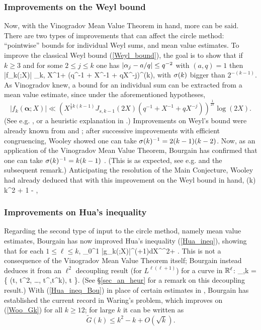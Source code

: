 \documentclass[brochure,english,12pt]{bourbaki}%
\newcommand{\albf}{\boldsymbol\alpha}
\begin{document}
\subsubsection{Improvements on the Weyl bound}
Now, with the Vinogradov Mean Value Theorem in hand, more can be said. There are two types of improvements that can affect the circle method: ``pointwise''  bounds for  individual Weyl sums, and  mean value estimates. 
To improve the classical Weyl bound (\ref{Weyl_bound}), the goal is to show that if $k \geq 3$ and for some $2 \leq j \leq k$ one has $|\alpha_j - a/q| \leq q^{-2}$ with $(a,q)=1$ then 
\beq\label{Weyl_bound'}
 |f_k(\albf;X)| \ll_{k,\ep} X^{1+\ep} (q^{-1} + X^{-1}  + qX^{-j})^{\sig(k)},
\eeq
with $\sigma(k)$ bigger than $2^{-(k-1)}$.
As Vinogradov knew, a bound for an individual sum can be extracted from a mean value estimate, since  under the aforementioned hypotheses,
\[
|f_k(\albf;X)| \ll ( X^{\frac{1}{2}k(k-1)} J_{s,k-1}(2X) (q^{-1} + X^{-1} + qX^{-j}))^{\frac{1}{2s}} \log (2X).
\]
(See e.g. \cite[Thm. 5.2]{Vau97}, or a heuristic explanation in \cite[\S 1]{Woo14b}.)
 Improvements on Weyl's bound were already known from \cite{HB88} and \cite{RobSar00}; after successive improvements with efficient congruencing, Wooley \cite[Thm. 7.3]{Woo14b} showed one can take $\sigma(k)^{-1} =  2(k-1)(k-2)$. Now, as an application of the Vinogradov Mean Value Theorem, Bourgain has confirmed that one can take $\sigma(k)^{-1} = k(k-1)$  \cite[Thm. 5]{Bou16x}. (This is as expected, see e.g. \cite[Ch. 4 Thm. 4]{Mon94} and the subsequent remark.)
Anticipating the resolution of the Main Conjecture, Wooley \cite[Thm. 4.1]{Woo12b} had already deduced that with this improvement on the Weyl bound in hand, 
\beq\label{Woo_Gk}
 (k) \leq k^2 + 1 - , \qquad  {}
 \eeq


\subsubsection{Improvements on Hua's inequality}\label{sec_Hua}
Regarding the second type of input to the circle method, namely mean value estimates, Bourgain \cite[Thm. 10]{Bou16x} has now improved Hua's inequality (\ref{Hua_ineq}), showing that for each $1 \leq \ell \leq k$,
\beq\label{Hua_ineq_Bou}
\int_0^1 |g_k(\al;X)|^{\ell(\ell+1)}d\al \ll X^{\ell^2+\ep} .
\eeq
This is not a consequence  of the Vinogradov Mean Value Theorem itself; Bourgain instead deduces it from an $\ell^2$ decoupling result (for $L^{\ell(\ell+1)}$) for a curve in $\mathbb{R}^\ell$:
\beq\label{Gamma_Hua}
 \Gamma_{\ell,k} = \{ (t, t^2, \ldots, t^{},t^k), t \in [1,2] \}.
 \eeq
(See \S \ref{sec_an_heur} for a remark on this decoupling result.)
With (\ref{Hua_ineq_Bou}) in place of certain estimates in \cite{Woo12b}, Bourgain \cite[Thm. 11]{Bou16x} has established the current record in Waring's problem, which improves on (\ref{Woo_Gk}) for all $k \geq 12$;  for large $k$ it can be written as
\[ \tilde{G}(k) \leq k^2 -k +O(\sqrt{k}).\]
\end{document}
